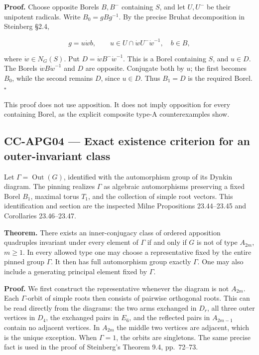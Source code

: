 \textbf{Proof.} Choose opposite Borels \(B,B^{-}\) containing \(S\), and
let \(U,U^{-}\) be their unipotent radicals. Write \(B_0=gBg^{-1}\). By
the precise Bruhat decomposition in Steinberg §2.4,

\[
 g=u\dot w b,\qquad
 u\in U\cap\dot wU^{-}\dot w^{-1},\quad b\in B,
\]

where \(\dot w\in N_G(S)\). Put \(D=\dot wB^{-}\dot w^{-1}\). This is a
Borel containing \(S\), and \(u\in D\). The Borels
\(\dot wB\dot w^{-1}\) and \(D\) are opposite. Conjugate both by \(u\);
the first becomes \(B_0\), while the second remains \(D\), since
\(u\in D\). Thus \(B_1=D\) is the required Borel. \(\square\)

This proof does not use apposition. It does not imply opposition for
every containing Borel, as the explicit composite type-A counterexamples
show.

\subsection{CC-APG04 --- Exact existence criterion for an
outer-invariant
class}\label{cc-apg04-exact-existence-criterion-for-an-outer-invariant-class}

Let \(\Gamma=\operatorname{Out}(G)\), identified with the automorphism
group of its Dynkin diagram. The pinning realizes \(\Gamma\) as
algebraic automorphisms preserving a fixed Borel \(B_1\), maximal torus
\(T_1\), and the collection of simple root vectors. This identification
and section are the inspected Milne Propositions 23.44--23.45 and
Corollaries 23.46--23.47.

\textbf{Theorem.} There exists an inner-conjugacy class of ordered
apposition quadruples invariant under every element of \(\Gamma\) if and
only if \(G\) is not of type \(A_{2m}\), \(m\geq1\). In every allowed
type one may choose a representative fixed by the entire pinned group
\(\Gamma\). It then has full automorphism group exactly \(\Gamma\). One
may also include a generating principal element fixed by \(\Gamma\).

\textbf{Proof.} We first construct the representative whenever the
diagram is not \(A_{2m}\). Each \(\Gamma\)-orbit of simple roots then
consists of pairwise orthogonal roots. This can be read directly from
the diagrams: the two arms exchanged in \(D_r\), all three outer
vertices in \(D_4\), the exchanged pairs in \(E_6\), and the reflected
pairs in \(A_{2m-1}\) contain no adjacent vertices. In \(A_{2m}\) the
middle two vertices are adjacent, which is the unique exception. When
\(\Gamma=1\), the orbits are singletons. The same precise fact is used
in the proof of Steinberg's Theorem 9.4, pp.~72--73.

